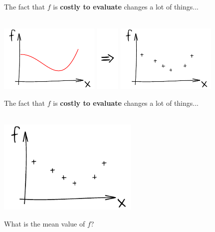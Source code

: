 \begin{frame}{}
The fact that $f$ is \textbf{costly to evaluate} changes a lot of things...\\
\vspace{5mm}
\\
\vspace{5mm}
\begin{center}
\includegraphics[height=3.2cm]{1_stat_models/figures/ink_f} \includegraphics[height=3.2cm]{1_stat_models/figures/Rightarrow} \includegraphics[height=3.2cm]{1_stat_models/figures/ink_fX}
\end{center}
\end{frame}

\begin{frame}{}
The fact that $f$ is \textbf{costly to evaluate} changes a lot of things...\\
\vspace{5mm}
\\
\vspace{5mm}
\begin{center}
\includegraphics[height=4.5cm]{1_stat_models/figures/ink_fX}
\end{center}
What is the mean value of $f$?
\end{frame}

